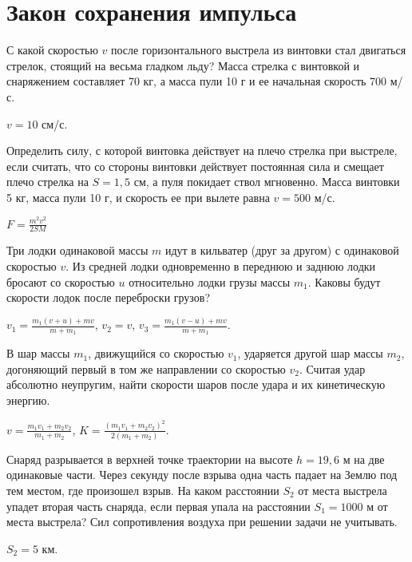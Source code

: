 \section{Закон сохранения импульса}

\begin{ex} %
С какой скоростью $v$ после горизонтального выстрела из винтовки стал двигаться стрелок, стоящий на весьма гладком льду? Масса стрелка с винтовкой и снаряжением составляет 70 кг, а масса пули 10 г и ее начальная скорость 700 м/с.
\begin{ans}
$v=10$ см/с.
\end{ans}
\end{ex}

\begin{ex} %
Определить силу, с которой винтовка действует на плечо стрелка при выстреле, если считать, что со стороны винтовки действует постоянная сила и смещает плечо стрелка на $S = 1,5$ см, а пуля покидает ствол мгновенно. Масса винтовки 5 кг, масса пули 10 г, и скорость ее при вылете равна $v = 500$ м/с.
\begin{ans}
$F = \frac{m^2 v^2}{2SM}$
\end{ans}
\end{ex}

\begin{ex} %
Три лодки одинаковой массы $m$ идут в кильватер (друг за другом) с одинаковой скоростью $v$. Из средней лодки одновременно в переднюю и заднюю лодки бросают со скоростью $u$ относительно лодки грузы массы $m_1$. Каковы будут скорости лодок после переброски грузов?
\begin{ans}
$v_1 = \frac{m_1(v+u)+mv}{m+m_1}$, $v_2 = v$, $v_3 = \frac{m_1(v-u)+mv}{m+m_1}$.
\end{ans}
\end{ex}

\begin{ex} %
В шар массы $m_1$, движущийся со скоростью $v_1$, ударяется другой шар массы $m_2$, догоняющий первый в том же направлении со скоростью $v_2$. Считая удар абсолютно неупругим, найти скорости шаров после удара и их кинетическую энергию.
\begin{ans}
$v = \frac{m_1v_1 + m_2v_2}{m_1+m_2}$, $K = \frac{(m_1v_1+m_2v_2)^2}{2(m_1+m_2)}$.
\end{ans}
\end{ex}

\begin{ex} %
Снаряд разрывается в верхней точке траектории на высоте $h = 19,6$ м на две одинаковые части. Через секунду после взрыва одна часть падает на Землю под тем местом, где произошел взрыв. На каком расстоянии $S_2$ от места выстрела упадет вторая часть снаряда, если первая упала на расстоянии $S_1 = 1000$ м от места выстрела? Сил сопротивления воздуха при решении задачи не учитывать.
\begin{ans}
$S_2 = 5$ км.
\end{ans}
\end{ex}

